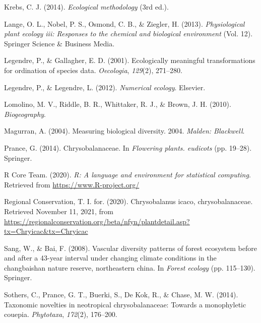 \documentclass[11pt,]{article}
\begin{document}
\hypertarget{ref-krebs1999ecological}{}
Krebs, C. J. (2014). \emph{Ecological methodology} (3rd ed.).

\hypertarget{ref-lange2013physiological}{}
Lange, O. L., Nobel, P. S., Osmond, C. B., \& Ziegler, H. (2013).
\emph{Physiological plant ecology iii: Responses to the chemical and
biological environment} (Vol. 12). Springer Science \& Business Media.

\hypertarget{ref-legendre2001ecologically}{}
Legendre, P., \& Gallagher, E. D. (2001). Ecologically meaningful
transformations for ordination of species data. \emph{Oecologia},
\emph{129}(2), 271--280.

\hypertarget{ref-legendre2012numerical}{}
Legendre, P., \& Legendre, L. (2012). \emph{Numerical ecology}.
Elsevier.

\hypertarget{ref-lomolino2017biogeography}{}
Lomolino, M. V., Riddle, B. R., Whittaker, R. J., \& Brown, J. H.
(2010). \emph{Biogeography}.

\hypertarget{ref-magurran2004measuring}{}
Magurran, A. (2004). Measuring biological diversity. 2004. \emph{Malden:
Blackwell}.

\hypertarget{ref-prance2014chrysobalanaceae}{}
Prance, G. (2014). Chrysobalanaceae. In \emph{Flowering plants.
eudicots} (pp. 19--28). Springer.

\hypertarget{ref-RStudio}{}
R Core Team. (2020). \emph{R: A language and environment for statistical
computing}. Retrieved from \url{https://www.R-project.org/}

\hypertarget{ref-ircCicaco}{}
Regional Conservation, T. I. for. (2020). Chrysobalanus icaco,
chrysobalanaceae. Retrieved November 11, 2021, from
\url{https://regionalconservation.org/beta/nfyn/plantdetail.asp?tx=Chryicac\&tx=Chryicac}

\hypertarget{ref-sang2008vascular}{}
Sang, W., \& Bai, F. (2008). Vascular diversity patterns of forest
ecosystem before and after a 43-year interval under changing climate
conditions in the changbaishan nature reserve, northeastern china. In
\emph{Forest ecology} (pp. 115--130). Springer.

\hypertarget{ref-sothers2014taxonomic}{}
Sothers, C., Prance, G. T., Buerki, S., De Kok, R., \& Chase, M. W.
(2014). Taxonomic novelties in neotropical chrysobalanaceae: Towards a
monophyletic couepia. \emph{Phytotaxa}, \emph{172}(2), 176--200.




\newpage
\singlespacing 
\end{document}
